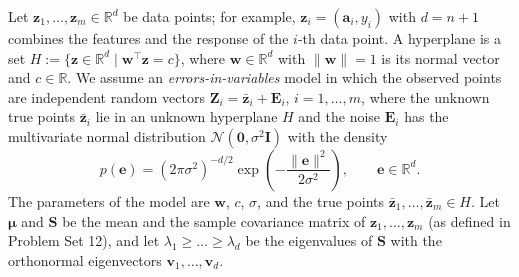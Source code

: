 \documentclass[letterpaper]{article}
\newcommand{\Real}{\mathbb{R}}
\newcommand{\tr}{^\top}
\begin{document}
Let $\bm{z}_1, \dots, \bm{z}_m \in \Real^d$ be data points; for example, $\bm{z}_i = (\bm{a}_i, y_i)$ with $d = n + 1$ combines the features and the response of the $i$-th data point. A hyperplane is a set $H := \{\bm{z} \in \Real^d \mid \bm{w}\tr\bm{z} = c\}$, where $\bm{w} \in \Real^d$ with $\|\bm{w}\| = 1$ is its normal vector and $c \in \Real$. We assume an \emph{errors-in-variables} model in which the observed points are independent random vectors $\bm{Z}_i = \bar{\bm{z}}_i + \bm{E}_i$, $i = 1, \dots, m$, where the unknown true points $\bar{\bm{z}}_i$ lie in an unknown hyperplane $H$ and the noise $\bm{E}_i$ has the multivariate normal distribution $\mathcal{N}(\bm{0}, \sigma^2\bm{I})$ with the density
\[
  p(\bm{e}) = (2\pi\sigma^2)^{-d/2} \exp\left(-\frac{\|\bm{e}\|^2}{2\sigma^2}\right), \qquad \bm{e} \in \Real^d.
\]
The parameters of the model are $\bm{w}$, $c$, $\sigma$, and the true points $\bar{\bm{z}}_1, \dots, \bar{\bm{z}}_m \in H$. Let $\bm{\mu}$ and $\bm{S}$ be the mean and the sample covariance matrix of $\bm{z}_1, \dots, \bm{z}_m$ (as defined in Problem Set 12), and let $\lambda_1 \ge \dots \ge \lambda_d$ be the eigenvalues of $\bm{S}$ with the orthonormal eigenvectors $\bm{v}_1, \dots, \bm{v}_d$.
\end{document}
